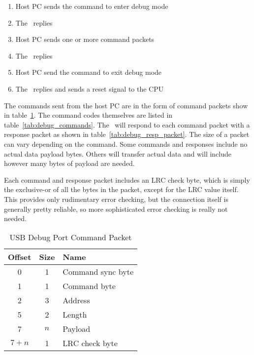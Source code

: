 \begin{enumerate}
    \item Host PC sends the command to enter debug mode
    \item The \jr\ replies
    \item Host PC sends one or more command packets
    \item The \jr\ replies
    \item Host PC send the command to exit debug mode
    \item The \jr\ replies and sends a reset signal to the CPU
\end{enumerate}

The commands sent from the host PC are in the form of command packets show in table~\ref{tab:debug_cmd_packet}. The command codes themselves are listed in table~\ref{tab:debug_commands}. The \jr\ will respond to each command packet with a response packet as shown in table~\ref{tab:debug_resp_packet}. The size of a packet can vary depending on the command. Some commands and responses include no actual data payload bytes. Others will transfer actual data and will include however many bytes of payload are needed.

Each command and response packet includes an LRC check byte, which is simply the exclusive-or of all the bytes in the packet, except for the LRC value itself. This provides only rudimentary error checking, but the connection itself is generally pretty reliable, so more sophisticated error checking is really not needed.

\begin{table}[ht]
    \begin{center}
        \begin{tabular}{|c|c|l|} \hline
            Offset & Size & Name \\ \hline\hline
            0 & 1 & Command sync byte\\ \hline
            1 & 1 & Command byte \\ \hline
            2 & 3 & Address \\ \hline
            5 & 2 & Length \\ \hline
            7 & $n$ & Payload \\ \hline
            $7 + n$ & 1 & LRC check byte\\ \hline
        \end{tabular}
    \end{center}
    \caption{USB Debug Port Command Packet}
    \label{tab:debug_cmd_packet}
\end{table}

